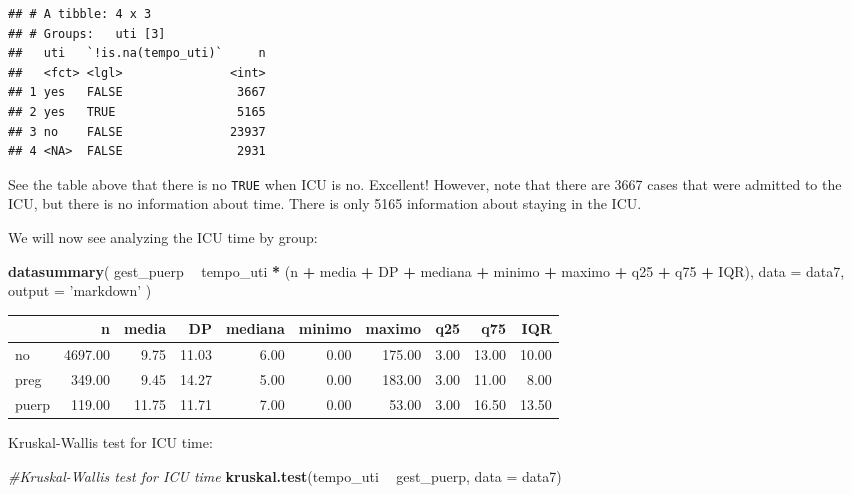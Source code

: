 \documentclass[
]{article}
\newenvironment{Shaded}{\begin{snugshade}}{\end{snugshade}}
\newcommand{\CommentTok}[1]{\textcolor[rgb]{0.56,0.35,0.01}{\textit{#1}}}
\newcommand{\DataTypeTok}[1]{\textcolor[rgb]{0.13,0.29,0.53}{#1}}
\newcommand{\KeywordTok}[1]{\textcolor[rgb]{0.13,0.29,0.53}{\textbf{#1}}}
\newcommand{\NormalTok}[1]{#1}
\newcommand{\OperatorTok}[1]{\textcolor[rgb]{0.81,0.36,0.00}{\textbf{#1}}}
\newcommand{\StringTok}[1]{\textcolor[rgb]{0.31,0.60,0.02}{#1}}
\begin{document}
\begin{verbatim}
## # A tibble: 4 x 3
## # Groups:   uti [3]
##   uti   `!is.na(tempo_uti)`     n
##   <fct> <lgl>               <int>
## 1 yes   FALSE                3667
## 2 yes   TRUE                 5165
## 3 no    FALSE               23937
## 4 <NA>  FALSE                2931
\end{verbatim}

See the table above that there is no \texttt{TRUE} when ICU is no.
Excellent! However, note that there are 3667 cases that were admitted to
the ICU, but there is no information about time. There is only 5165
information about staying in the ICU.

We will now see analyzing the ICU time by group:

\begin{Shaded}
\begin{Highlighting}[]
\KeywordTok{datasummary}\NormalTok{(}
\NormalTok{  gest_puerp }\OperatorTok{~}\StringTok{ }\NormalTok{tempo_uti }\OperatorTok{*}\StringTok{ }\NormalTok{(n }\OperatorTok{+}\StringTok{ }\NormalTok{media }\OperatorTok{+}\StringTok{ }\NormalTok{DP }\OperatorTok{+}\StringTok{ }\NormalTok{mediana }\OperatorTok{+}\StringTok{ }\NormalTok{minimo }\OperatorTok{+}\StringTok{ }\NormalTok{maximo }\OperatorTok{+}\StringTok{ }\NormalTok{q25 }\OperatorTok{+}\StringTok{ }\NormalTok{q75 }\OperatorTok{+}\StringTok{ }\NormalTok{IQR),}
  \DataTypeTok{data =}\NormalTok{ data7,}
  \DataTypeTok{output =} \StringTok{'markdown'}
\NormalTok{)}
\end{Highlighting}
\end{Shaded}

\begin{longtable}[]{@{}lrrrrrrrrr@{}}
\toprule
& n & media & DP & mediana & minimo & maximo & q25 & q75 &
IQR\tabularnewline
\midrule
\endhead
no & 4697.00 & 9.75 & 11.03 & 6.00 & 0.00 & 175.00 & 3.00 & 13.00 &
10.00\tabularnewline
preg & 349.00 & 9.45 & 14.27 & 5.00 & 0.00 & 183.00 & 3.00 & 11.00 &
8.00\tabularnewline
puerp & 119.00 & 11.75 & 11.71 & 7.00 & 0.00 & 53.00 & 3.00 & 16.50 &
13.50\tabularnewline
\bottomrule
\end{longtable}

Kruskal-Wallis test for ICU time:

\begin{Shaded}
\begin{Highlighting}[]
\CommentTok{#Kruskal-Wallis test for ICU time}
\KeywordTok{kruskal.test}\NormalTok{(tempo_uti }\OperatorTok{~}\StringTok{ }\NormalTok{gest_puerp,}
             \DataTypeTok{data =}\NormalTok{ data7)}
\end{Highlighting}
\end{Shaded}
\end{document}
